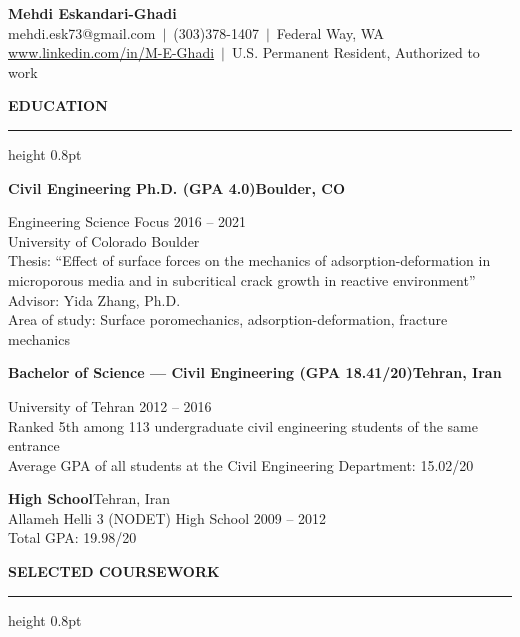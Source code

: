 \documentclass[10pt, letterpaper]{article}
\newcommand{\rsection}[1]{%
  \vspace{10pt}%
  {\large\bfseries\MakeUppercase{#1}}%
  \vspace{1pt}%
  \hrule height 0.8pt%
  \vspace{5pt}%
}
\newcommand{\jobline}[2]{%
  \vspace{5pt}%
  \noindent\textbf{#1}\hfill\textbf{#2}\par%
  \vspace{1pt}%
}
\begin{document}
\pagestyle{empty}

\begin{center}
  {\LARGE\bfseries Mehdi Eskandari-Ghadi}\\[4pt]
  mehdi.esk73@gmail.com\ $|$\ (303)378-1407\ $|$\ Federal Way, WA\\[2pt]
  \href{http://www.linkedin.com/in/M-E-Ghadi}{www.linkedin.com/in/M-E-Ghadi}\ $|$\
  U.S. Permanent Resident, Authorized to work
\end{center}

\vspace{4pt}

\rsection{Education}

\jobline{Civil Engineering Ph.D. (GPA 4.0)}{Boulder, CO}
Engineering Science Focus \hfill 2016 -- 2021\\
University of Colorado Boulder\\[2pt]
Thesis: ``Effect of surface forces on the mechanics of adsorption-deformation in microporous media and in subcritical crack growth in reactive environment''\\
Advisor: Yida Zhang, Ph.D.\\
Area of study: Surface poromechanics, adsorption-deformation, fracture mechanics

\vspace{6pt}
\jobline{Bachelor of Science --- Civil Engineering (GPA 18.41/20)}{Tehran, Iran}
University of Tehran \hfill 2012 -- 2016\\
Ranked 5th among 113 undergraduate civil engineering students of the same entrance\\
Average GPA of all students at the Civil Engineering Department: 15.02/20

\vspace{6pt}
\noindent\textbf{High School}\hfill Tehran, Iran\\
Allameh Helli 3 (NODET) High School \hfill 2009 -- 2012\\
Total GPA: 19.98/20

\rsection{Selected Coursework}
\end{document}
